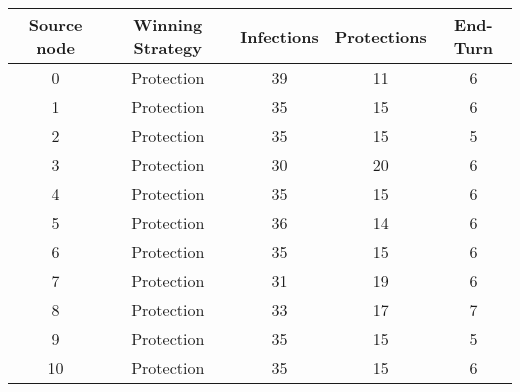 \documentclass[results.tex]{subfiles}
\begin{document}
    \begin{center}
        \begin{tabular}{| c || c | c | c | c |}
            \hline
            {\bfseries Source node} & {\bfseries Winning Strategy} & {\bfseries Infections} & {\bfseries Protections}
            & {\bfseries End-Turn}
            \\  %
            \hline\hline
            0                       & Protection                   & 39                     & 11                      & 6                    \\
            \hline
            1                       & Protection                   & 35                     & 15                      & 6                    \\
            \hline
            2                       & Protection                   & 35                     & 15                      & 5                    \\
            \hline
            3                       & Protection                   & 30                     & 20                      & 6                    \\
            \hline
            4                       & Protection                   & 35                     & 15                      & 6                    \\
            \hline
            5                       & Protection                   & 36                     & 14                      & 6                    \\
            \hline
            6                       & Protection                   & 35                     & 15                      & 6                    \\
            \hline
            7                       & Protection                   & 31                     & 19                      & 6                    \\
            \hline
            8                       & Protection                   & 33                     & 17                      & 7                    \\
            \hline
            9                       & Protection                   & 35                     & 15                      & 5                    \\
            \hline
            10                      & Protection                   & 35                     & 15                      & 6                    \\

\end{tabular}
\end{center}
\end{document}
